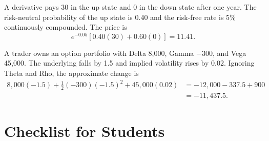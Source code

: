\begin{exmp}
A derivative pays 30 in the up state and 0 in the down state after one year.
The risk-neutral probability of the up state is 0.40 and the risk-free rate is
5\% continuously compounded. The price is
\[
    e^{-0.05}[0.40(30)+0.60(0)]
    =
    11.41.
\]
\end{exmp}

\begin{exmp}
A trader owns an option portfolio with Delta 8,000, Gamma $-300$, and Vega
45,000. The underlying falls by 1.5 and implied volatility rises by 0.02.
Ignoring Theta and Rho, the approximate change is
\[
\begin{aligned}
    8{,}000(-1.5)
    +\frac{1}{2}(-300)(-1.5)^2
    +45{,}000(0.02)
    &=
    -12{,}000-337.5+900
    \\
    &=
    -11{,}437.5.
\end{aligned}
\]
\end{exmp}

\section{Checklist for Students}

